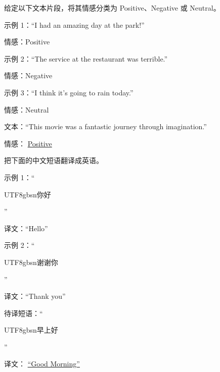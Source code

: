 \vspace{0.5em}
\begin{tcolorbox}
\begin{center}
\parbox{0.9\textwidth}
{

{\color{blue} 给定以下文本片段，将其情感分类为 Positive、Negative 或 Neutral。}

\vspace{0.5em}

{\color{ugreen} 示例 1：``I had an amazing day at the park!''}

{\color{ugreen} 情感：Positive}

\vspace{0.3em}

{\color{ugreen} 示例 2：``The service at the restaurant was terrible.''}

{\color{ugreen} 情感：Negative}

\vspace{0.3em}

{\color{ugreen} 示例 3：``I think it's going to rain today.''}

{\color{ugreen} 情感：Neutral}

\vspace{0.5em}

{\color{blue} 文本：``This movie was a fantastic journey through imagination.''}

{\color{blue} 情感：} \underline{Positive}

}
\end{center}
\end{tcolorbox}
\vspace{0.5em}

\vspace{0.5em}
\begin{tcolorbox}
\begin{center}
\parbox{0.9\textwidth}
{

{\color{blue} 把下面的中文短语翻译成英语。}

\vspace{0.5em}

{\color{ugreen} 示例 1：``\begin{CJK*}{UTF8}{gbsn}你好\end{CJK*}''}

{\color{ugreen} 译文：``Hello''}

\vspace{0.3em}

{\color{ugreen} 示例 2：``\begin{CJK*}{UTF8}{gbsn}谢谢你\end{CJK*}''}

{\color{ugreen} 译文：``Thank you''}

\vspace{0.5em}

{\color{blue} 待译短语：``\begin{CJK*}{UTF8}{gbsn}早上好\end{CJK*}''}

{\color{blue} 译文：} \underline{``Good Morning''}

}
\end{center}
\end{tcolorbox}
\vspace{0.5em}

